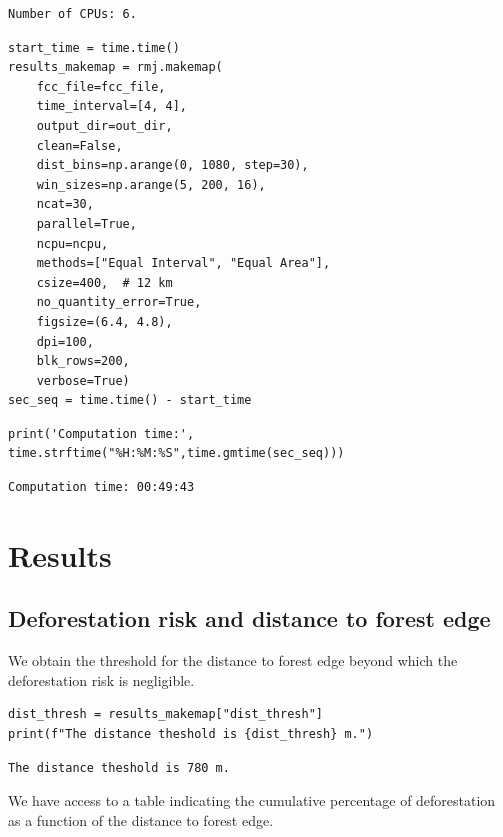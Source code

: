 \documentclass[paper=a4, 12pt, DIV=12]{scrartcl}
\begin{document}
\begin{verbatim}
Number of CPUs: 6.
\end{verbatim}


\begin{verbatim}
start_time = time.time()
results_makemap = rmj.makemap(
    fcc_file=fcc_file,
    time_interval=[4, 4],
    output_dir=out_dir,
    clean=False,
    dist_bins=np.arange(0, 1080, step=30),
    win_sizes=np.arange(5, 200, 16),
    ncat=30,
    parallel=True,
    ncpu=ncpu,
    methods=["Equal Interval", "Equal Area"],
    csize=400,  # 12 km
    no_quantity_error=True,
    figsize=(6.4, 4.8),
    dpi=100,
    blk_rows=200,
    verbose=True)
sec_seq = time.time() - start_time
\end{verbatim}

\begin{verbatim}
print('Computation time:', time.strftime("%H:%M:%S",time.gmtime(sec_seq)))
\end{verbatim}

\begin{verbatim}
Computation time: 00:49:43
\end{verbatim}

\section{Results}
\label{sec:orgf5a7312}

\subsection{Deforestation risk and distance to forest edge}
\label{sec:orgb732ae1}

We obtain the threshold for the distance to forest edge beyond which the deforestation risk is negligible.

\begin{verbatim}
dist_thresh = results_makemap["dist_thresh"]
print(f"The distance theshold is {dist_thresh} m.")
\end{verbatim}

\begin{verbatim}
The distance theshold is 780 m.
\end{verbatim}


We have access to a table indicating the cumulative percentage of deforestation as a function of the distance to forest edge.
\end{document}

